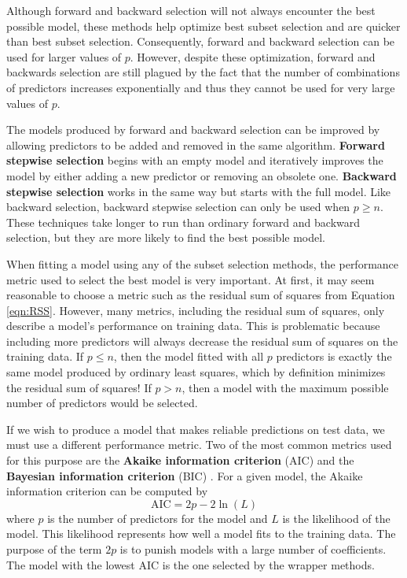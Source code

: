 \documentclass{article}
\begin{document}
Although forward and backward selection will not always encounter the best possible model, these methods help optimize best subset selection and are quicker than best subset selection. Consequently, forward and backward selection can be used for larger values of $p$. However, despite these optimization, forward and backwards selection are still plagued by the fact that the number of combinations of predictors increases exponentially and thus they cannot be used for very large values of $p$.

The models produced by forward and backward selection can be improved by allowing predictors to be added and removed in the same algorithm. \textbf{Forward stepwise selection} begins with an empty model and iteratively improves the model by either adding a new predictor or removing an obsolete one. \textbf{Backward stepwise selection} works in the same way but starts with the full model. Like backward selection, backward stepwise selection can only be used when $p\geq n$. These techniques take longer to run than ordinary forward and backward selection, but they are more likely to find the best possible model.

When fitting a model using any of the subset selection methods, the performance metric used to select the best model is very important. At first, it may seem reasonable to choose a metric such as the residual sum of squares from Equation \ref{eqn:RSS}. However, many metrics, including the residual sum of squares, only describe a model's performance on training data. This is problematic because including more predictors will always decrease the residual sum of squares on the training data. If $p\leq n$, then the model fitted with all $p$ predictors is exactly the same model produced by ordinary least squares, which by definition minimizes the residual sum of squares! If $p>n$, then a model with the maximum possible number of predictors would be selected.

If we wish to produce a model that makes reliable predictions on test data, we must use a different performance metric. Two of the most common metrics used for this purpose are the \textbf{Akaike information criterion} (AIC) and the \textbf{Bayesian information criterion} (BIC) \cite{akaike1998information, schwarz1978estimating}. For a given model, the Akaike information criterion can be computed by
\begin{equation}
	\text{AIC} = 2p - 2\ln(L)
\end{equation}
where $p$ is the number of predictors for the model and $L$ is the likelihood of the model. This likelihood represents how well a model fits to the training data. The purpose of the term $2p$ is to punish models with a large number of coefficients. The model with the lowest AIC is the one selected by the wrapper methods.
\end{document}
